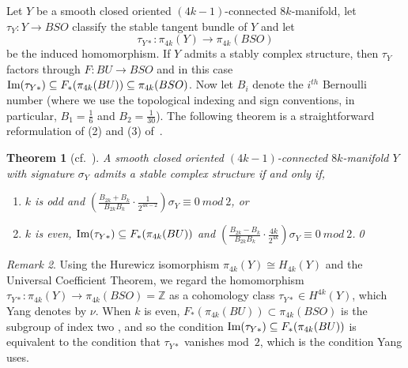 \documentclass[12pt]{amsart}
\newcommand\Z{\mathbb{Z}}
\newcommand\im{\textup{Im}}
\newtheorem{Theorem}{Theorem}[section]
\theoremstyle{remark}
\newtheorem{Remark}[Theorem]{Remark}
\begin{document}
Let $Y$ be a smooth closed oriented $(4k{-}1)$-connected $8k$-manifold, 
let $\tau_Y \colon Y \to BSO$ classify the stable tangent bundle 
of $Y$ and let
%
\[ \tau_{Y*} \colon \pi_{4k}(Y) \to \pi_{4k}(BSO) \]
%
be the induced homomorphism.  
If $Y$ admits a stably complex structure, then $\tau_Y$ factors through $F \colon BU \to BSO$
and in this case ${\im(\tau_{Y*})} \subseteq F_*(\pi_{4k}(BU)) \subseteq \pi_{4k}(BSO)$.
Now let $B_i$ denote the $i^{th}$ Bernoulli number (where we
use the topological indexing and sign conventions, in particular,
$B_1=\frac{1}{6}$ and $B_2=\frac{1}{30}$).  The following theorem
is a straightforward reformulation of (2) and (3) of~\cite[Theorem~1]{Yang12}.
%
\begin{Theorem}[cf.~{\cite[Theorem 1, (2) \& (3)]{Yang12}}] \label{thm:Yang}
A smooth closed oriented $(4k{-}1)$-connected $8k$-manifold $Y$ with signature
$\sigma_Y$ admits a stable complex structure if and only if,
\begin{enumerate}
\item $k$ is odd and $\left(\frac{B_{2k}+B_{k}}{B_{2k}B_{k}} \cdot
  \frac{1}{2^{4k{-}2}}\right)\sigma_Y \equiv 0~mod~2$, or
\item $k$ is even, $\im(\tau_{Y*}) \subseteq F_*(\pi_{4k}(BU))$ and
  $\left(\frac{B_{2k}-B_{k}}{B_{2k}B_{k}} \cdot \frac{4k}{2^{4k}}\right)\sigma_Y
  \equiv 0~mod~2$.\qed
\end{enumerate}
%
\end{Theorem}

\begin{Remark} \label{rem:Yang_and_us}
Using the Hurewicz isomorphism $\pi_{4k}(Y) \cong H_{4k}(Y)$ and 
the Universal Coefficient Theorem, we regard the homomorphism
$\tau_{Y*} \colon \pi_{4k}(Y) \to \pi_{4k}(BSO) = \Z$ as a cohomology class 
$\tau_{Y*} \in H^{4k}(Y)$, which Yang denotes by $\nu$.
When $k$ is even, $F_*(\pi_{4k}(BU)) \subset \pi_{4k}(BSO)$ is the subgroup of index two 
\cite{Bott59}, and so the condition $\im(\tau_{Y*}) \subseteq F_*(\pi_{4k}(BU))$ is equivalent 
to the condition that $\tau_{Y*}$ vanishes mod~$2$, which is the condition Yang uses.
\end{Remark}
\end{document}
